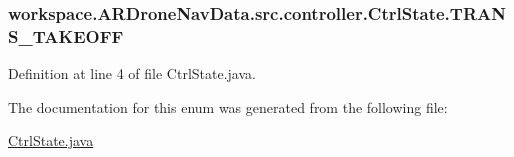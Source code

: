\subsubsection[{T\+R\+A\+N\+S\+\_\+\+T\+A\+K\+E\+O\+F\+F}]{\setlength{\rightskip}{0pt plus 5cm}workspace.\+A\+R\+Drone\+Nav\+Data.\+src.\+controller.\+Ctrl\+State.\+T\+R\+A\+N\+S\+\_\+\+T\+A\+K\+E\+O\+F\+F}\label{enumworkspace_1_1_a_r_drone_nav_data_1_1src_1_1controller_1_1_ctrl_state_ae3c0f7718462c6ffa0d4dbf8f9de6764}


Definition at line 4 of file Ctrl\+State.\+java.



The documentation for this enum was generated from the following file\+:\begin{DoxyCompactItemize}
\item 
\hyperlink{_ctrl_state_8java}{Ctrl\+State.\+java}\end{DoxyCompactItemize}
